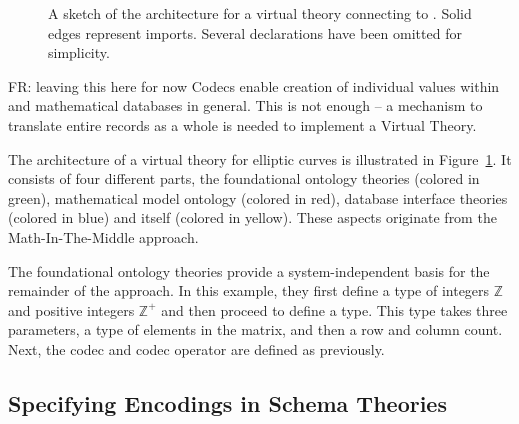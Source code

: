 \begin{figure}[ht]
{
    }
    \endgroup
  \caption[Virtual Theory Architecture]{
    A sketch of the architecture for a virtual theory connecting to \lmfdb. 
    Solid edges represent imports. 
    Several declarations have been omitted for simplicity. 
  }
  \label{fig:vtarch}
\end{figure}

\begin{oldpart}{FR: leaving this here for now}
Codecs enable creation of individual values within \lmfdb and mathematical databases in general. 
This is not enough -- a mechanism to translate entire records as a whole is needed to implement a Virtual Theory. 

The architecture of a virtual theory for \lmfdb elliptic curves is illustrated in Figure~\ref{fig:vtarch}. 
It consists of four different parts, the foundational ontology theories (colored in green), mathematical model ontology (colored in red), database interface theories (colored in blue) and \lmfdb itself (colored in yellow). 
These aspects originate from the Math-In-The-Middle approach. 

The foundational ontology theories provide a system-independent basis for the remainder of the approach. 
In this example, they first define a type of integers $\mathbb{Z}$ and positive integers $\mathbb{Z}^{+}$ and then proceed to define a  type. 
This type takes three parameters, a type of elements in the matrix, and then a row and column count. 
Next, the codec  and codec operator  are defined as previously. 
\end{oldpart}


\subsection{Specifying Encodings in Schema Theories}


